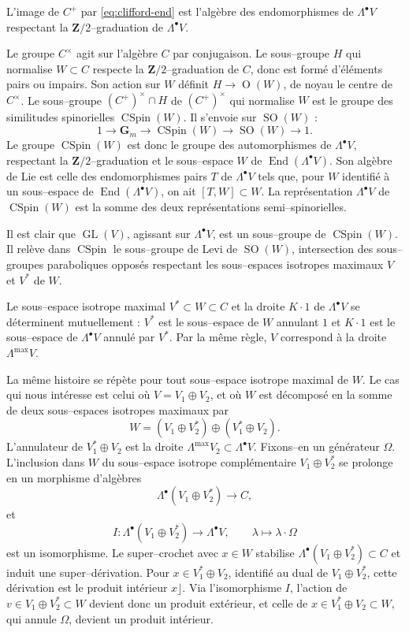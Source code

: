 \documentclass[11pt,a4paper]{article}
\theoremstyle{plain}
\theoremstyle{definition}
\DeclareMathOperator{\End}{End}
\DeclareMathOperator{\CSpin}{CSpin}
\DeclareMathOperator{\GL}{GL}
\DeclareMathOperator{\SO}{SO}
\DeclareMathOperator{\Ogrp}{O}
\begin{document}
L'image de $C^+$ par \eqref{eq:clifford-end} est l'alg\`ebre des endomorphismes de $\Lambda^\bullet V$ respectant la $\mathbf{Z}/2$--graduation de $\Lambda^\bullet V$.

Le groupe $C^\times$ agit sur l'alg\`ebre $C$ par conjugaison. Le sous--groupe $H$ qui normalise $W \subset C$ respecte la $\mathbf{Z}/2$--graduation de $C$, donc est form\'e d'\'el\'ements pairs ou impairs. Son action sur $W$ d\'efinit $H \to \Ogrp(W)$, de noyau le centre de $C^\times$. Le sous--groupe $(C^+)^\times \cap H$ de $(C^+)^\times$ qui normalise $W$ est le groupe des similitudes spinorielles $\CSpin(W)$. Il s'envoie sur $\SO(W)$ :
\[
1 \longrightarrow \mathbf{G}_m \longrightarrow \CSpin(W) \longrightarrow \SO(W) \longrightarrow 1 .
\]
Le groupe $\CSpin(W)$ est donc le groupe des automorphismes de $\Lambda^\bullet V$, respectant la $\mathbf{Z}/2$--graduation et le sous--espace $W$ de $\End(\Lambda^\bullet V)$. Son alg\`ebre de Lie est celle des endomorphismes pairs $T$ de $\Lambda^\bullet V$ tels que, pour $W$ identifi\'e \`a un sous--espace de $\End(\Lambda^\bullet V)$, on ait $[T, W] \subset W$. La repr\'esentation $\Lambda^\bullet V$ de $\CSpin(W)$ est la somme des deux repr\'esentations semi--spinorielles.

Il est clair que $\GL(V)$, agissant sur $\Lambda^\bullet V$, est un sous--groupe de $\CSpin(W)$. Il rel\`eve dans $\CSpin$ le sous--groupe de Levi de $\SO(W)$, intersection des sous--groupes paraboliques oppos\'es respectant les sous--espaces isotropes maximaux $V$ et $V^*$ de $W$.

Le sous--espace isotrope maximal $V^* \subset W \subset C$ et la droite $K \cdot 1$ de $\Lambda^\bullet V$ se d\'eterminent mutuellement : $V^*$ est le sous--espace de $W$ annulant $1$ et $K \cdot 1$ est le sous--espace de $\Lambda^\bullet V$ annul\'e par $V^*$. Par la m\^eme r\`egle, $V$ correspond \`a la droite $\Lambda^{\max} V$.

La m\^eme histoire se r\'ep\`ete pour tout sous--espace isotrope maximal de $W$. Le cas qui nous int\'eresse est celui o\`u $V = V_1 \oplus V_2$, et o\`u $W$ est d\'ecompos\'e en la somme de deux sous--espaces isotropes maximaux par
\[
W = (V_1 \oplus V_2^*) \oplus (V_1^* \oplus V_2) .
\]
L'annulateur de $V_1^* \oplus V_2$ est la droite $\Lambda^{\max} V_2 \subset \Lambda^\bullet V$. Fixons--en un g\'en\'erateur $\Omega$. L'inclusion dans $W$ du sous--espace isotrope compl\'ementaire $V_1 \oplus V_2^*$ se prolonge en un morphisme d'alg\`ebres
\[
\Lambda^\bullet(V_1 \oplus V_2^*) \longrightarrow C ,
\]
et
\begin{equation}\label{eq:isom}
I : \Lambda^\bullet(V_1 \oplus V_2^*) \longrightarrow \Lambda^\bullet V, \qquad \lambda \longmapsto \lambda \cdot \Omega
\end{equation}
est un isomorphisme. Le super--crochet avec $x \in W$ stabilise $\Lambda^\bullet(V_1 \oplus V_2^*) \subset C$ et induit une super--d\'erivation. Pour $x \in V_1^* \oplus V_2$, identifi\'e au dual de $V_1 \oplus V_2^*$, cette d\'erivation est le produit int\'erieur $x \rfloor$. Via l'isomorphisme $I$, l'action de $v \in V_1 \oplus V_2^* \subset W$ devient donc un produit ext\'erieur, et celle de $x \in V_1^* \oplus V_2 \subset W$, qui annule $\Omega$, devient un produit int\'erieur.
\end{document}
